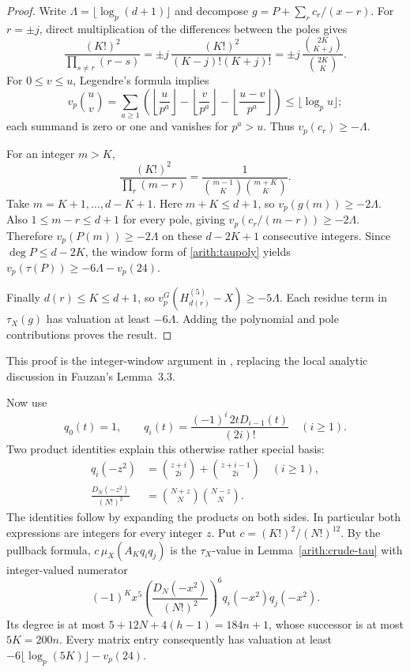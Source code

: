 \begin{proof}
Write $\Lambda=\lfloor\log_p(d+1)\rfloor$ and decompose
$g=P+\sum_r c_r/(x-r)$. For $r=\pm j$, direct multiplication of the
differences between the poles gives
\[
 \frac{(K!)^2}
 {\prod_{s\ne r}(r-s)}
 =\pm j\,\frac{(K!)^2}{(K-j)!(K+j)!}
 =\pm j\,\frac{\binom{2K}{K+j}}{\binom{2K}{K}}.
\]
For $0\le v\le u$, Legendre's formula implies
\[
 v_p\binom uv
 =\sum_{a\ge1}\left(
 \left\lfloor\frac u{p^a}\right\rfloor
 -\left\lfloor\frac v{p^a}\right\rfloor
 -\left\lfloor\frac{u-v}{p^a}\right\rfloor\right)
 \le\lfloor\log_p u\rfloor;
\]
each summand is zero or one and vanishes for $p^a>u$.
Thus $v_p(c_r)\ge-\Lambda$.

For an integer $m>K$,
\[
 \frac{(K!)^2}{\prod_r(m-r)}
 =\frac1{\binom{m-1}{K}\binom{m+K}{K}}.
\]
Take $m=K+1,\ldots,d-K+1$. Here $m+K\le d+1$, so
$v_p(g(m))\ge-2\Lambda$. Also $1\le m-r\le d+1$ for every pole,
giving $v_p(c_r/(m-r))\ge-2\Lambda$. Therefore
$v_p(P(m))\ge-2\Lambda$ on these $d-2K+1$ consecutive integers.
Since $\deg P\le d-2K$, the window form of
\eqref{arith:taupoly} yields
$v_p(\tau(P))\ge-6\Lambda-v_p(24)$.

Finally $d(r)\le K\le d+1$, so
$v_p^G(H_{d(r)}^{(5)}-X)\ge-5\Lambda$.
Each residue term in $\tau_X(g)$ has valuation at least $-6\Lambda$.
Adding the polynomial and pole contributions proves the result.
\end{proof}

This proof is the integer-window argument in
\cite[\texttt{SmallPrimeTau.lean}, \texttt{crude\_tauX}]{firsching},
replacing the local analytic discussion in Fauzan's Lemma~3.3.

Now use
\[
 q_0(t)=1,\qquad
 q_i(t)=\frac{(-1)^i\,2tD_{i-1}(t)}{(2i)!}\quad(i\ge1).
\]
Two product identities explain this otherwise rather special basis:
\begin{align*}
 q_i(-z^2)&=\binom{z+i}{2i}+\binom{z+i-1}{2i}\quad(i\ge1),\\
 \frac{D_N(-z^2)}{(N!)^2}
 &=\binom{N+z}{N}\binom{N-z}{N}.
\end{align*}
The identities follow by expanding the products on both sides. In
particular both expressions are integers for every integer $z$.
Put $c=(K!)^2/(N!)^{12}$. By the pullback formula,
$c\,\mu_X(A_Kq_iq_j)$ is the $\tau_X$-value in
Lemma~\ref{arith:crude-tau} with integer-valued numerator
\[
 (-1)^Kx^5
 \left(\frac{D_N(-x^2)}{(N!)^2}\right)^6
 q_i(-x^2)q_j(-x^2).
\]
Its degree is at most
$5+12N+4(h-1)=184n+1$, whose successor is at most $5K=200n$.
Every matrix entry consequently has valuation at least
$-6\lfloor\log_p(5K)\rfloor-v_p(24)$.


